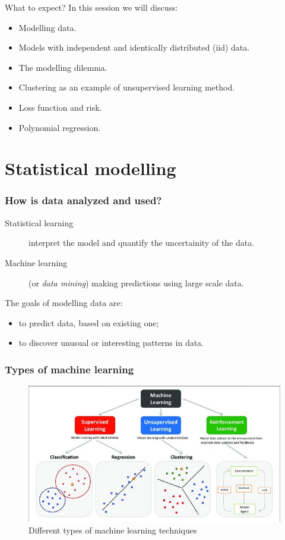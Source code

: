 \documentclass{beamer}
\begin{document}
\begin{frame}{What to expect?}
  In this session we will discuss:
  \begin{itemize}
    \item Modelling data.
    \item Models with independent and identically distributed (iid) data.
    \item The modelling dilemma.
    \item Clustering as an example of unsupervised learning method.
    \item Loss function and risk.
    \item Polynomial regression.
  \end{itemize}
\end{frame}

\section{Statistical modelling}

\begin{frame}
\frametitle{How is data analyzed and used?}


\begin{description}
  \item [Statistical learning] interpret the model and quantify the uncertainity of the data.
  \item [Machine learning] (or {\em data mining}) making predictions using large scale data.
\end{description}

The goals of modelling data are:
\begin{itemize}
  \item to predict data, based on existing one;
  \item to discover unusual or interesting patterns in data. 
\end{itemize}

\end{frame}

\begin{frame}
  \frametitle{Types of machine learning}
    
    \begin{figure}
      \includegraphics[width=0.9\linewidth]{MLtypes}
      \caption{Different types of machine learning techniques\cite{peng_machine_2021}}
      \label{fig:MLtypes}
    \end{figure}
  
  \end{frame}
\end{document}
